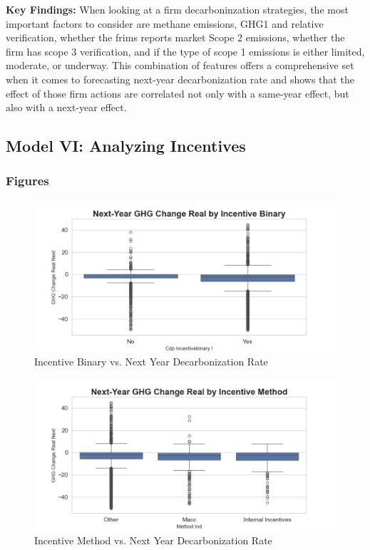 \textbf{Key Findings:} When looking at a firm decarboninzation strategies, the most important factors to consider are methane emissions, GHG1 and relative verification, whether the frims reports market Scope 2 emissions, whether the firm has scope 3 verification, and if the type of scope 1 emissions is either limited, moderate, or underway. This combination of features offers a comprehensive set when it comes to forecasting next-year decarbonization rate and shows that the effect of those firm actions are correlated not only with a same-year effect, but also with a next-year effect.
    


\subsection{Model VI: Analyzing Incentives}



\subsubsection{Figures}
\begin{figure}[H]
\centering
    \includegraphics[width=\textwidth]{figures/ghg_change_real_next_by_cdp_incentivebinary_i.png}
\caption{Incentive Binary vs. Next Year Decarbonization Rate}
\label{fig:ghg_change_real_next_by_cdp_incentivebinary_i}
\end{figure}

\begin{figure}[H]
\centering
    \includegraphics[width=\textwidth]{figures/ghg_change_real_next_by_method_ind.png}
\caption{Incentive Method vs. Next Year Decarbonization Rate}
\label{fig:ghg_change_real_next_by_method_ind}
\end{figure}

